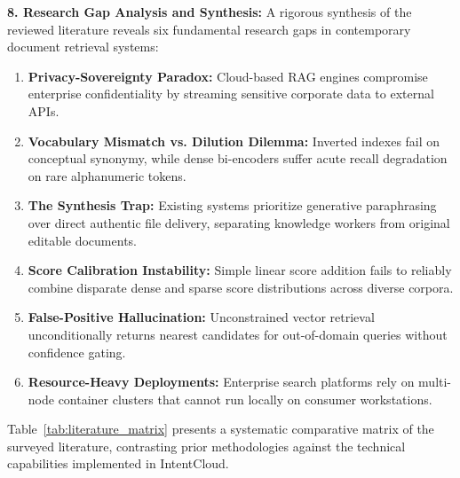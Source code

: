 \documentclass[a4paper,12pt]{article}
\begin{document}
\vspace{0.8em}
\noindent\textbf{8. Research Gap Analysis and Synthesis:}
A rigorous synthesis of the reviewed literature reveals six fundamental research gaps in contemporary document retrieval systems:
\begin{enumerate}
    \item \textbf{Privacy-Sovereignty Paradox:} Cloud-based RAG engines compromise enterprise confidentiality by streaming sensitive corporate data to external APIs.
    \item \textbf{Vocabulary Mismatch vs. Dilution Dilemma:} Inverted indexes fail on conceptual synonymy, while dense bi-encoders suffer acute recall degradation on rare alphanumeric tokens.
    \item \textbf{The Synthesis Trap:} Existing systems prioritize generative paraphrasing over direct authentic file delivery, separating knowledge workers from original editable documents.
    \item \textbf{Score Calibration Instability:} Simple linear score addition fails to reliably combine disparate dense and sparse score distributions across diverse corpora.
    \item \textbf{False-Positive Hallucination:} Unconstrained vector retrieval unconditionally returns nearest candidates for out-of-domain queries without confidence gating.
    \item \textbf{Resource-Heavy Deployments:} Enterprise search platforms rely on multi-node container clusters that cannot run locally on consumer workstations.
\end{enumerate}

Table~\ref{tab:literature_matrix} presents a systematic comparative matrix of the surveyed literature, contrasting prior methodologies against the technical capabilities implemented in IntentCloud.
\end{document}
